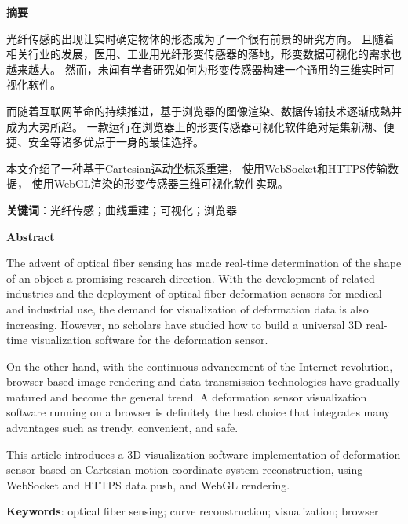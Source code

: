 \cleardoublepage{}
\begin{center}
    \bfseries {} 摘要
\end{center}

光纤传感的出现让实时确定物体的形态成为了一个很有前景的研究方向。
且随着相关行业的发展，医用、工业用光纤形变传感器的落地，形变数据可视化的需求也越来越大。
然而，未闻有学者研究如何为形变传感器构建一个通用的三维实时可视化软件。

而随着互联网革命的持续推进，基于浏览器的图像渲染、数据传输技术逐渐成熟并成为大势所趋。
一款运行在浏览器上的形变传感器可视化软件绝对是集新潮、便捷、安全等诸多优点于一身的最佳选择。

本文介绍了一种基于Cartesian运动坐标系重建，
使用WebSocket和HTTPS传输数据，
使用WebGL渲染的形变传感器三维可视化软件实现。

\textbf{关键词}：光纤传感；曲线重建；可视化；浏览器

\clearpage{}

\begin{center}
    \bfseries {} Abstract
\end{center}

The advent of optical fiber sensing has made real-time determination of the shape of an object a promising research direction. 
With the development of related industries and the deployment of optical fiber deformation sensors for medical and industrial use, 
the demand for visualization of deformation data is also increasing. 
However, no scholars have studied how to build a universal 3D real-time visualization software for the deformation sensor.

On the other hand, with the continuous advancement of the Internet revolution, 
browser-based image rendering and data transmission technologies have gradually matured and become the general trend. 
A deformation sensor visualization software running on a browser is definitely the best choice that integrates many advantages such as trendy, convenient, and safe.

This article introduces a 3D visualization software implementation of deformation sensor 
based on Cartesian motion coordinate system reconstruction, using WebSocket and HTTPS data push, and WebGL rendering.

\textbf{Keywords}: optical fiber sensing; curve reconstruction; visualization; browser